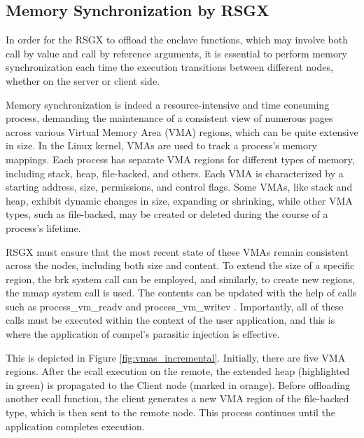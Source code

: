 \documentclass[article, doublespace,nopageskip]{VTthesis} %
\newcommand{\monitor}{RSGX \xspace}
\begin{document}
    \subsection{Memory Synchronization by \monitor}
    In order for the \monitor to offload the enclave functions, which may involve both call by value and call by reference arguments, it is essential to perform memory synchronization each time the execution transitions between different nodes, whether on the server or client side. 
    
    Memory synchronization is indeed a resource-intensive and time consuming process, demanding the maintenance of a consistent view of numerous pages across various Virtual Memory Area (VMA) regions, which can be quite extensive in size. In the Linux kernel, VMAs are used to track a process's memory mappings. Each process has separate VMA regions for different types of memory, including stack, heap, file-backed, and others. Each VMA is characterized by a starting address, size, permissions, and control flags. Some VMAs, like stack and heap, exhibit dynamic changes in size, expanding or shrinking, while other VMA types, such as file-backed, may be created or deleted during the course of a process's lifetime.

    \monitor must ensure that the most recent state of these VMAs remain consistent across the nodes, including both size and content. To extend the size of a specific region, the brk system call \cite{systemcall::brk} can be employed, and similarly, to create new regions, the mmap system call \cite{systemcall::mmap} is used. The contents can be updated with the help of calls such as process\_vm\_readv \cite{processVmReadv} and process\_vm\_writev \cite{processVmWritev}. Importantly, all of these calls must be executed within the context of the user application, and this is where the application of compel's \cite{COMPEL} parasitic injection is effective. 
    
    This is depicted in Figure \ref{fig:vmas_incremental}. Initially, there are five VMA regions. After the ecall execution on the remote, the extended heap (highlighted in green) is propagated to the Client node (marked in orange). Before offloading another ecall function, the client generates a new VMA region of the file-backed type, which is then sent to the remote node. This process continues until the application completes execution.
\end{document}
